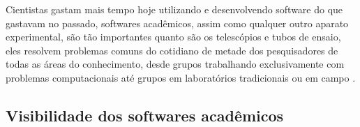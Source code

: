 Cientistas gastam mais tempo hoje utilizando e desenvolvendo
software do que gastavam no passado, softwares acadêmicos, assim como
qualquer outro aparato experimental, são tão importantes quanto
são os telescópios e tubos de ensaio, eles resolvem problemas comuns do
cotidiano de metade dos pesquisadores de todas as áreas do conhecimento, desde grupos
trabalhando exclusivamente com problemas computacionais até grupos em
laboratórios tradicionais ou em campo \cite{wilson2014best}.

%

\subsection{Visibilidade dos softwares acadêmicos}

%


